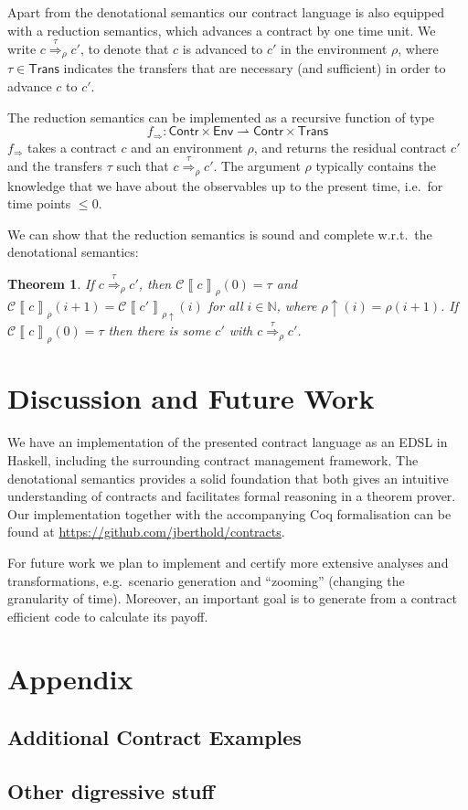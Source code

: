 \documentclass[a4paper,debug,twocolumn]{easychair}
\newcommand{\comm}[3][red]{{\small \color{#1}{$\spadesuit$#2: #3}}}
\newcommand{\jbcomment}[1]{\comm[orange]{jb}{#1}}
\newcommand\type[1]{\mathsf{#1}}
\newcommand\nats{{\mathbb N}}
\newcommand\pto{\rightharpoonup}
\newcommand\cSem[2]{{\mathcal C}\left\llbracket#1\right\rrbracket_{#2}}
\newcommand\cRed[2]{\stackrel{#2}\Rightarrow_{#1}}
\newcommand\cRedFun{f_{\Rightarrow}}
\newcommand\envAdv[1]{#1\uparrow}
\theoremstyle{plain}
\newtheorem{theorem}{Theorem}
\begin{document}
Apart from the denotational semantics our contract language is also
equipped with a reduction semantics, which advances a contract by one
time unit. We write $c \cRed \rho \tau c'$, to denote that $c$ is
advanced to $c'$ in the environment $\rho$, where $\tau \in
\type{Trans}$ indicates the transfers that are necessary (and
sufficient) in order to advance $c$ to $c'$.

The reduction semantics can be implemented as a recursive function of
type 
\[
\cRedFun \colon\type{Contr}\times \type{Env} \pto \type{Contr} \times \type{Trans}
\]
$\cRedFun$ takes a contract $c$ and an environment $\rho$, and returns
the residual contract $c'$ and the transfers $\tau$ such that $c
\cRed\rho\tau c'$. The argument $\rho$ typically contains the
knowledge that we have about the observables up to the present time,
i.e.\ for time points $\leq 0$.

We can show that the reduction semantics is sound and complete w.r.t.\
the denotational semantics:
\begin{theorem}
  If $c \cRed\rho\tau c'$, then $\cSem c {\rho} (0) = \tau$ and $\cSem
  c {\rho} (i+1) = \cSem{c'}{\envAdv{\rho}}(i)$ for all $i \in \nats$,
  where $\envAdv{\rho} (i) = \rho(i+1)$. If $\cSem c \rho (0) = \tau$
  then there is some $c'$ with $c \cRed\rho\tau c'$.
\end{theorem}


\section{Discussion and Future Work}
\label{sec:disc-future-work}



We have an implementation of the presented contract language as an
EDSL in Haskell, including the surrounding contract management
framework. The denotational semantics provides a solid foundation that
both gives an intuitive understanding of contracts and facilitates
formal reasoning in a theorem prover. Our implementation together with
the accompanying Coq formalisation can be found at
\url{https://github.com/jberthold/contracts}.

For future work we plan to implement and certify more extensive
analyses and transformations, e.g.\ scenario generation and
``zooming'' (changing the granularity of time). Moreover, an important
goal is to generate from a contract efficient code to calculate its
payoff.





\newpage
\appendix

\section*{Appendix}
\subsection*{Additional Contract Examples}
\jbcomment{Something from the FX portfolio, plus some asian option and the Lexifi barrier product (both use acc)}

\subsection*{Other digressive stuff}
\jbcomment{what else goes here? otherwise drop it}
\end{document}
